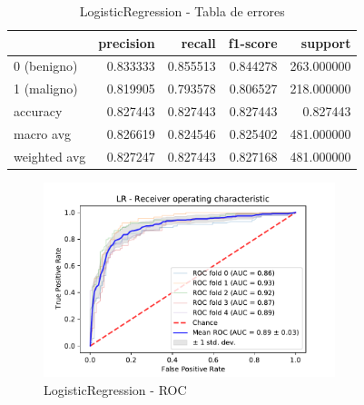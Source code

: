 \documentclass[12pt,twoside]{report}
\begin{document}
\begin{table}[htp]
\begin{center}
\begin{tabular}{lrrrr}
\toprule
{} &  precision &    recall &  f1-score &     support \\
\midrule
0 (benigno) &   0.833333 &  0.855513 &  0.844278 &  263.000000 \\
1 (maligno) &   0.819905 &  0.793578 &  0.806527 &  218.000000 \\
accuracy     &   0.827443 &  0.827443 &  0.827443 &    0.827443 \\
macro avg    &   0.826619 &  0.824546 &  0.825402 &  481.000000 \\
weighted avg &   0.827247 &  0.827443 &  0.827168 &  481.000000 \\
\bottomrule
\end{tabular}
\end{center}
\caption{LogisticRegression - Tabla de errores}
\label{lr:precision}
\end{table}

\begin{figure}[htp]
\begin{center}
\includegraphics[width=8.5cm]{./code/figures_python/roc/lr.pdf}%
\end{center}
 \caption{LogisticRegression - ROC}
 \label{lr:roc}
 \end{figure}
 
\end{document}
